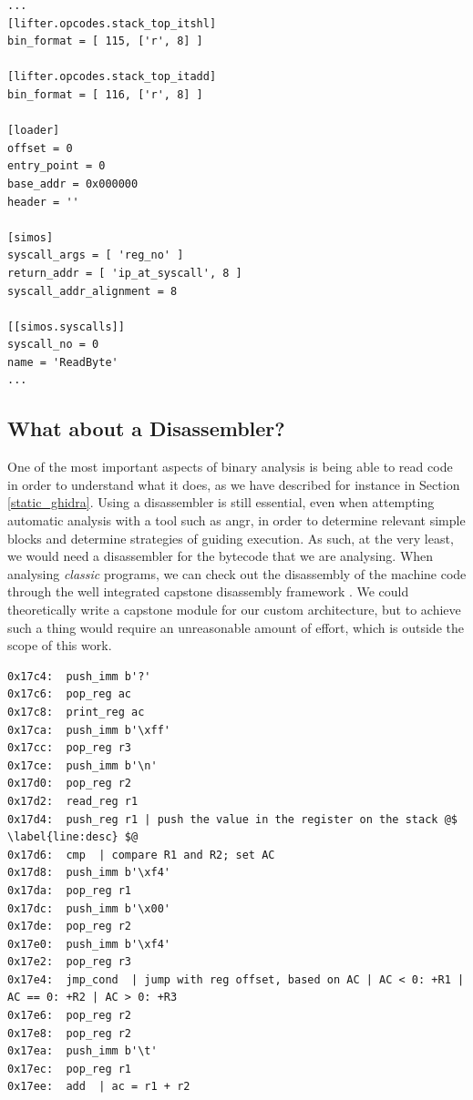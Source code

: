 \begin{lstlisting}[label={lst:config}, caption={TODO}]
...
[lifter.opcodes.stack_top_itshl]
bin_format = [ 115, ['r', 8] ]

[lifter.opcodes.stack_top_itadd]
bin_format = [ 116, ['r', 8] ]

[loader]
offset = 0
entry_point = 0
base_addr = 0x000000
header = ''

[simos]
syscall_args = [ 'reg_no' ]
return_addr = [ 'ip_at_syscall', 8 ]
syscall_addr_alignment = 8

[[simos.syscalls]]
syscall_no = 0
name = 'ReadByte'
...
\end{lstlisting}

\subsection{What about a Disassembler?}

One of the most important aspects of binary analysis is being able to read code in order to understand what it does, as we have described for instance in Section \ref{static_ghidra}. Using a disassembler is still essential, even when attempting automatic analysis with a tool such as angr, in order to determine relevant simple blocks and determine strategies of guiding execution. As such, at the very least, we would need a disassembler for the bytecode that we are analysing. When analysing \emph{classic} programs, we can check out the disassembly of the machine code through the well integrated capstone disassembly framework \cite{capstone}. We could theoretically write a capstone module for our custom architecture, but to achieve such a thing would require an unreasonable amount of effort, which is outside the scope of this work.

\begin{lstlisting}[label={lst:disass}, caption={TODO}]
0x17c4:  push_imm b'?'
0x17c6:  pop_reg ac
0x17c8:  print_reg ac
0x17ca:  push_imm b'\xff'
0x17cc:  pop_reg r3
0x17ce:  push_imm b'\n'
0x17d0:  pop_reg r2
0x17d2:  read_reg r1
0x17d4:  push_reg r1 | push the value in the register on the stack @$ \label{line:desc} $@
0x17d6:  cmp  | compare R1 and R2; set AC
0x17d8:  push_imm b'\xf4'
0x17da:  pop_reg r1
0x17dc:  push_imm b'\x00'
0x17de:  pop_reg r2
0x17e0:  push_imm b'\xf4'
0x17e2:  pop_reg r3
0x17e4:  jmp_cond  | jump with reg offset, based on AC | AC < 0: +R1 | AC == 0: +R2 | AC > 0: +R3
0x17e6:  pop_reg r2
0x17e8:  pop_reg r2
0x17ea:  push_imm b'\t'
0x17ec:  pop_reg r1
0x17ee:  add  | ac = r1 + r2
\end{lstlisting}

